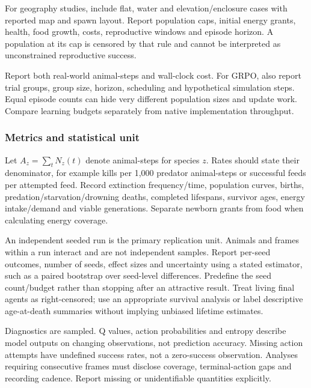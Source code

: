 For geography studies, include flat, water and elevation/enclosure cases with
reported map and spawn layout. Report population caps, initial energy grants,
health, food growth, costs, reproductive windows and episode horizon. A population
at its cap is censored by that rule and cannot be interpreted as unconstrained
reproductive success.

Report both real-world animal-steps and wall-clock cost. For GRPO, also report
trial groups, group size, horizon, scheduling and hypothetical simulation steps.
Equal episode counts can hide very different population sizes and update work.
Compare learning budgets separately from native implementation throughput.

\subsubsection{Metrics and statistical unit}
Let $A_z=\sum_t N_z(t)$ denote animal-steps for species $z$. Rates should state
their denominator, for example kills per 1,000 predator animal-steps or successful
feeds per attempted feed. Record extinction frequency/time, population curves,
births, predation/starvation/drowning deaths, completed lifespans, survivor ages,
energy intake/demand and viable generations. Separate newborn grants from food
when calculating energy coverage.

An independent seeded run is the primary replication unit. Animals and frames
within a run interact and are not independent samples. Report per-seed outcomes,
number of seeds, effect sizes and uncertainty using a stated estimator, such as
a paired bootstrap over seed-level differences. Predefine the seed count/budget
rather than stopping after an attractive result. Treat living final agents as
right-censored; use an appropriate survival analysis or label descriptive
age-at-death summaries without implying unbiased lifetime estimates.

Diagnostics are sampled. Q values, action probabilities and entropy describe
model outputs on changing observations, not prediction accuracy. Missing action
attempts have undefined success rates, not a zero-success observation. Analyses
requiring consecutive frames must disclose coverage, terminal-action gaps and
recording cadence. Report missing or unidentifiable quantities explicitly.
